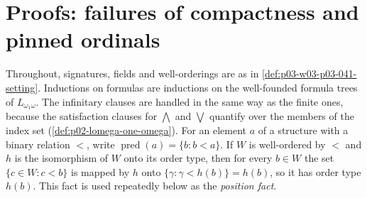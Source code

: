 \section{Proofs: failures of compactness and pinned ordinals}
\label{sec:annex-p03-w03-p03-041-compactness-failures}

Throughout, signatures, fields and well-orderings are as in
\cref{def:p03-w03-p03-041-setting}. Inductions on formulas are inductions
on the well-founded formula trees of \(L_{\omega_1\omega}\). The infinitary
clauses are handled in the same way as the finite ones, because the
satisfaction clauses for \(\bigwedge\) and \(\bigvee\) quantify over the
members of the index set (\cref{def:p02-lomega-one-omega}). For an element
\(a\) of a structure with a binary relation \(<\), write
\(\operatorname{pred}(a)=\{b:b<a\}\). If \(W\) is well-ordered by \(<\)
and \(h\) is the isomorphism of \(W\) onto its order type, then for every
\(b\in W\) the set \(\{c\in W:c<b\}\) is mapped by \(h\) onto
\(\{\gamma:\gamma<h(b)\}=h(b)\), so it has order type \(h(b)\). This fact
is used repeatedly below as the \emph{position fact}.

